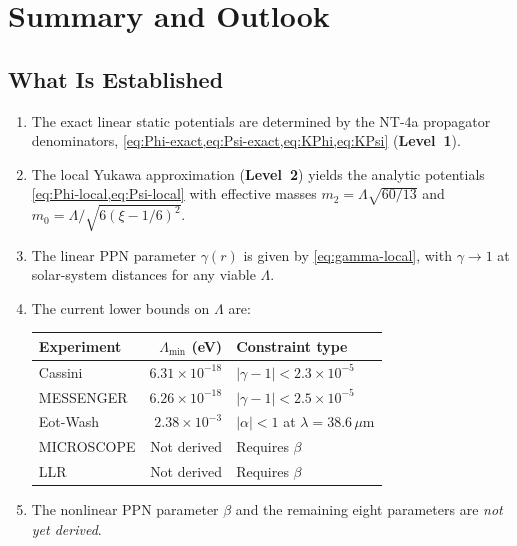 \documentclass[11pt,a4paper]{article}
\begin{document}
\section{Summary and Outlook}
\label{sec:summary}

\subsection{What Is Established}

\begin{enumerate}[label=\arabic*., leftmargin=2em]
  \item The exact linear static potentials are determined by the NT-4a
    propagator denominators,
    \cref{eq:Phi-exact,eq:Psi-exact,eq:KPhi,eq:KPsi} (\textbf{Level~1}).

  \item The local Yukawa approximation (\textbf{Level~2}) yields the
    analytic potentials \cref{eq:Phi-local,eq:Psi-local} with effective
    masses $m_2 = \Lambda\sqrt{60/13}$ and
    $m_0 = \Lambda/\!\sqrt{6(\xi-1/6)^2}$.

  \item The linear PPN parameter $\gamma(r)$ is given by
    \cref{eq:gamma-local}, with $\gamma \to 1$ at solar-system distances
    for any viable $\Lambda$.

  \item The current lower bounds on $\Lambda$ are:
    \begin{center}
    \begin{tabular}{lrl}
    \toprule
    Experiment & $\Lambda_\mathrm{min}$ (eV) & Constraint type \\
    \midrule
    Cassini & $6.31 \times 10^{-18}$ & $|\gamma-1| < 2.3 \times 10^{-5}$ \\
    MESSENGER & $6.26 \times 10^{-18}$ & $|\gamma-1| < 2.5 \times 10^{-5}$ \\
    Eot-Wash & $2.38 \times 10^{-3}$ & $|\alpha| < 1$ at $\lambda = 38.6\,\mu$m \\
    MICROSCOPE & Not derived & Requires $\beta$ \\
    LLR & Not derived & Requires $\beta$ \\
    \bottomrule
    \end{tabular}
    \end{center}

  \item The nonlinear PPN parameter $\beta$ and the remaining eight
    parameters are \emph{not yet derived}.
\end{enumerate}
\end{document}
